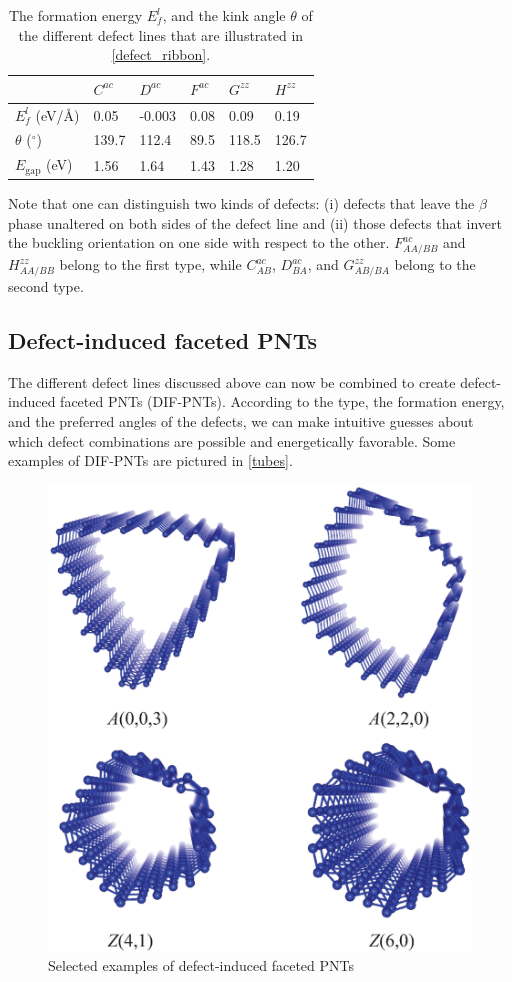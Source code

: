 \begin{table}[htb] 
\centering
\caption{The formation energy $E_f^l$, and the kink angle $\theta$ of the different defect lines that are illustrated in \autoref{defect_ribbon}. \label{tab-DL}}
\begin{tabularx}{0.8\linewidth}{l|XXXXX}   
\hline \hline
                      & $C^{ac}$ & $D^{ac}$ & $F^{ac}$  & $G^{zz}$ & $H^{zz}$\\
\hline
$E_f^l$	(eV/\AA)        &	 0.05  & -0.003  & 0.08 &  0.09  &  0.19 \\ 
$\theta$ ($^{\circ}$) &   139.7   &  112.4 & 89.5 & 118.5  & 126.7 \\
$E_{\text{gap}}$ (eV) & 1.56  & 1.64 & 1.43 & 1.28 & 1.20 \\
\hline \hline
\end{tabularx}
\end{table}


Note that one can distinguish two kinds of defects: (i) defects that leave the $\beta$ phase unaltered on both sides of the defect line and (ii) those defects that invert the buckling orientation on one side with respect to the other. $F_{AA/BB}^{ac}$ and $H_{AA/BB}^{zz}$ belong to the first type, while $C_{AB}^{ac}$, $D_{BA}^{ac}$, and $G_{AB/BA}^{zz}$ belong to the second type. 

\subsection{Defect-induced faceted PNTs}
The different defect lines discussed above can now be combined to create defect-induced faceted PNTs (DIF-PNTs).
According to the type, the formation energy, and the preferred angles of the defects, we can make intuitive guesses about which defect combinations are possible and energetically favorable. Some examples of DIF-PNTs are pictured in \autoref{tubes}. 

\begin{figure}[htbp]
\centering
\includegraphics[width=0.7\linewidth]{Nanotu_tubes.eps}%
\caption{Selected examples of defect-induced faceted PNTs \label{tubes}}
\end{figure}


